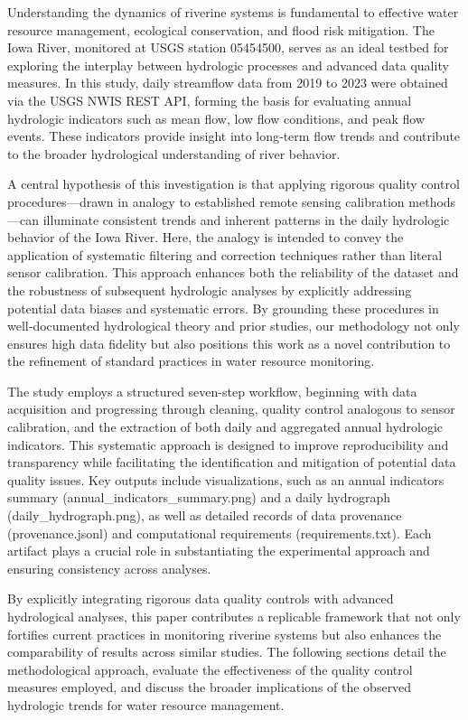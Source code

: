 \documentclass[preprint,12pt]{elsarticle}
\begin{document}
Understanding the dynamics of riverine systems is fundamental to effective water resource management, ecological conservation, and flood risk mitigation. The Iowa River, monitored at USGS station 05454500, serves as an ideal testbed for exploring the interplay between hydrologic processes and advanced data quality measures. In this study, daily streamflow data from 2019 to 2023 were obtained via the USGS NWIS REST API, forming the basis for evaluating annual hydrologic indicators such as mean flow, low flow conditions, and peak flow events. These indicators provide insight into long‐term flow trends and contribute to the broader hydrological understanding of river behavior.

A central hypothesis of this investigation is that applying rigorous quality control procedures—drawn in analogy to established remote sensing calibration methods—can illuminate consistent trends and inherent patterns in the daily hydrologic behavior of the Iowa River. Here, the analogy is intended to convey the application of systematic filtering and correction techniques rather than literal sensor calibration. This approach enhances both the reliability of the dataset and the robustness of subsequent hydrologic analyses by explicitly addressing potential data biases and systematic errors. By grounding these procedures in well‐documented hydrological theory and prior studies, our methodology not only ensures high data fidelity but also positions this work as a novel contribution to the refinement of standard practices in water resource monitoring.

The study employs a structured seven-step workflow, beginning with data acquisition and progressing through cleaning, quality control analogous to sensor calibration, and the extraction of both daily and aggregated annual hydrologic indicators. This systematic approach is designed to improve reproducibility and transparency while facilitating the identification and mitigation of potential data quality issues. Key outputs include visualizations, such as an annual indicators summary (annual\_indicators\_summary.png) and a daily hydrograph (daily\_hydrograph.png), as well as detailed records of data provenance (provenance.jsonl) and computational requirements (requirements.txt). Each artifact plays a crucial role in substantiating the experimental approach and ensuring consistency across analyses.

By explicitly integrating rigorous data quality controls with advanced hydrological analyses, this paper contributes a replicable framework that not only fortifies current practices in monitoring riverine systems but also enhances the comparability of results across similar studies. The following sections detail the methodological approach, evaluate the effectiveness of the quality control measures employed, and discuss the broader implications of the observed hydrologic trends for water resource management.
\end{document}
